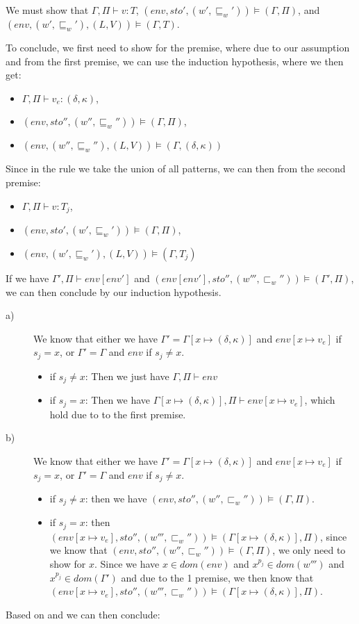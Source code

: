 We must show that  $\Gamma,\Pi\vdash v:T$,  $(env,sto',(w',\sqsubseteq_w'))\models(\Gamma,\Pi)$, and \\
 $(env,(w',\sqsubseteq_w'),(L,V))\models(\Gamma,T)$.

To conclude, we first need to show for the premise, where due to our assumption and from the first premise, we can use the induction hypothesis, where we then get:
\begin{itemize}
	\item $\Gamma,\Pi\vdash v_e:(\delta,\kappa)$,
	\item $(env,sto'',(w'',\sqsubseteq_w''))\models(\Gamma,\Pi)$,
	\item $(env,(w'',\sqsubseteq_w''),(L,V))\models(\Gamma,(\delta,\kappa))$
\end{itemize}
Since in the rule  we take the union of all patterns, we can then from the second premise:
\begin{itemize}
	\item $\Gamma,\Pi\vdash v:T_j$,
	\item $(env,sto',(w',\sqsubseteq_w'))\models(\Gamma,\Pi)$,
	\item $(env,(w',\sqsubseteq_w'),(L,V))\models(\Gamma,T_j)$
\end{itemize}

If we have  $\Gamma',\Pi\vdash env[env']$ and  $(env[env'],sto'',(w''',\sqsubset_w''))\models(\Gamma',\Pi)$, we can then conclude by our induction hypothesis.
\begin{description}
	\item[a)] We know that either we have $\Gamma'=\Gamma[x\mapsto(\delta,\kappa)]$ and $env[x\mapsto v_e]$ if $s_j=x$, or $\Gamma'=\Gamma$ and $env$ if $s_j\neq x$.
		\begin{itemize}
			\item if $s_j\neq x$: Then we just have $\Gamma,\Pi\vdash env$
			\item if $s_j=x$: Then we have $\Gamma[x\mapsto(\delta,\kappa)],\Pi\vdash env[x\mapsto v_e]$, which hold due to to the first premise.
		\end{itemize}
	\item[b)] We know that either we have $\Gamma'=\Gamma[x\mapsto(\delta,\kappa)]$ and $env[x\mapsto v_e]$ if $s_j=x$, or $\Gamma'=\Gamma$ and $env$ if $s_j\neq x$.
		\begin{itemize}
			\item if $s_j\neq x$: then we have $(env,sto'',(w'',\sqsubset_w''))\models(\Gamma,\Pi)$.
			\item if $s_j=x$: then $(env[x\mapsto v_e],sto'',(w''',\sqsubset_w''))\models(\Gamma[x\mapsto(\delta,\kappa)],\Pi)$, since we know that $(env,sto'',(w'',\sqsubset_w''))\models(\Gamma,\Pi)$, we only need to show for $x$.
				Since we have $x\in dom(env)$ and $x^{p_j}\in dom(w''')$ and $x^{p_j}\in dom(\Gamma')$ and due to the 1 premise, we then know that $(env[x\mapsto v_e],sto'',(w''',\sqsubset_w''))\models(\Gamma[x\mapsto(\delta,\kappa)],\Pi)$.
		\end{itemize}
\end{description}
Based on  and  we can then conclude:

